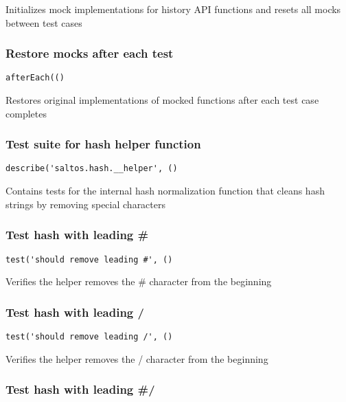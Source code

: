 \documentclass[a4paper]{article}
\begin{document}
Initializes mock implementations for history API functions
and resets all mocks between test cases

\hypertarget{toc628}{}
\subsubsection{Restore mocks after each test}

\begin{lstlisting}
afterEach(()
\end{lstlisting}

Restores original implementations of mocked functions
after each test case completes

\hypertarget{toc629}{}
\subsubsection{Test suite for hash helper function}

\begin{lstlisting}
describe('saltos.hash.__helper', ()
\end{lstlisting}

Contains tests for the internal hash normalization function
that cleans hash strings by removing special characters

\hypertarget{toc630}{}
\subsubsection{Test hash with leading \#}

\begin{lstlisting}
test('should remove leading #', ()
\end{lstlisting}

Verifies the helper removes the \# character from the beginning

\hypertarget{toc631}{}
\subsubsection{Test hash with leading /}

\begin{lstlisting}
test('should remove leading /', ()
\end{lstlisting}

Verifies the helper removes the / character from the beginning

\hypertarget{toc632}{}
\subsubsection{Test hash with leading \#/}
\end{document}
